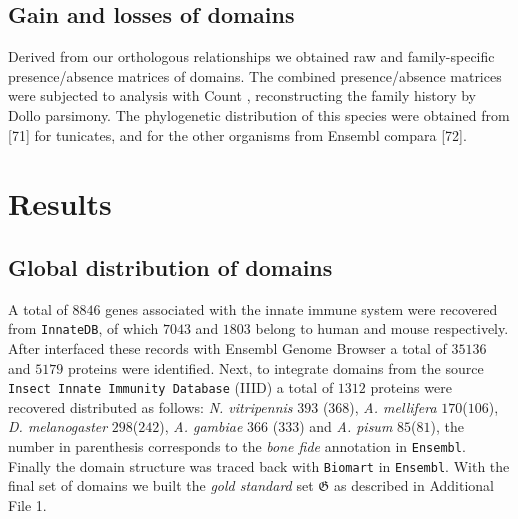 \documentclass[11pt]{article}
\newcommand{\TODO}[1]{\begingroup\color{red}#1\endgroup}
\begin{document}

\TODO{
\subsection*{Gain and losses of domains}

Derived from our orthologous relationships we obtained raw and family-specific 
presence/absence matrices of domains. The combined presence/absence matrices 
were subjected to analysis with Count \cite{csuros2010}, reconstructing the 
family history by Dollo parsimony. The phylogenetic distribution of this species 
were obtained from [71] for tunicates, and for the other organisms from Ensembl 
compara [72].
}
\section*{Results}

\subsection*{Global distribution of domains}

A total of $8846$ genes associated with the innate immune system were recovered 
from \texttt{InnateDB}, of which $7043$ and $1803$ belong to human and mouse 
respectively. After interfaced these records with Ensembl Genome Browser a total 
of $35136$ and $5179$ proteins were identified. Next, to integrate domains 
from the source \texttt{Insect Innate Immunity Database} (IIID) a total of 
$1312$ proteins were recovered distributed as follows: \textsl{N. vitripennis} 
$393$ ($368$), \textsl{A. mellifera} $170$($106$), \textsl{D. melanogaster} 
$298$($242$), \textsl{A. gambiae} $366$ ($333$) and \textsl{A. pisum} 
$85$($81$), the number in parenthesis corresponds to the \textsl{bone fide} 
annotation in \texttt{Ensembl}. Finally the domain structure was traced back 
with \texttt{Biomart} in \texttt{Ensembl}. With the final set of domains we 
built the \textsl{gold standard} set $\boldsymbol{\mathfrak{G}}$ as described 
in Additional File 1. 
\end{document}
